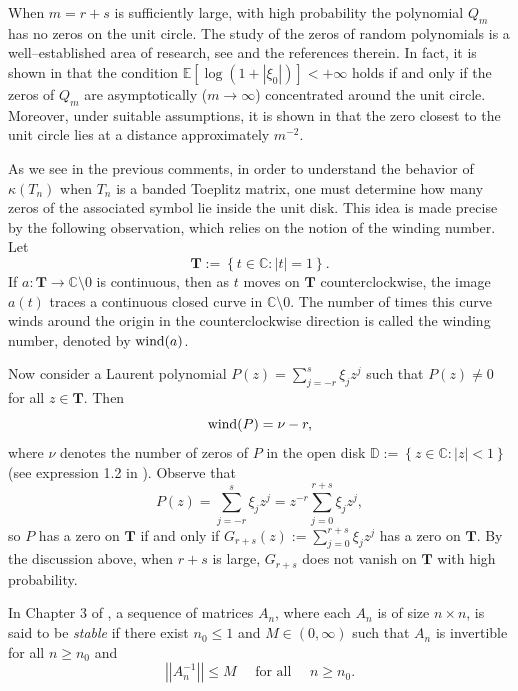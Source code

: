 \documentclass[12pt]{amsart}
\theoremstyle{plain}
\numberwithin{equation}{section}
\newcommand{\<}{\langle}
\renewcommand{\>}{\rangle}
\newcommand{\LL}[1]{\left\{#1\right\}}
\newcommand{\C}{\mathds{C}}
\newcommand{\E}[2][ ]{\mathbb{E}{#1}\left[#2\right]}
\newcommand{\abs}[1]{\left|#1\right|}
\newcommand{\norm}[1]{\left|\left|#1\right|\right|}
\begin{document}
When $m=r+s$ is sufficiently large, with high probability the polynomial $Q_m$ has no zeros on the unit circle. The study of the zeros of random polynomials is a well--established area of research, see \cite{barrera2022zero, bharucha-reid2014random, cook2023universality, ibragimov2013distribution, michelen2020closest, yakir2021approximately} and the references therein. In fact, it is shown in \cite{ibragimov2013distribution} that the condition $\E{\log(1+\abs{\xi_0})} < +\infty$ holds if and only if the zeros of $Q_m$ are asymptotically ($m\to\infty$) concentrated around the unit circle. Moreover, under suitable assumptions, it is shown in \cite{cook2023universality, michelen2020closest} that the zero closest to the unit circle lies at a distance approximately $m^{-2}$.

As we see in the previous comments, in order to understand the behavior of $\kappa(T_n)$ when $T_n$ is a banded Toeplitz matrix, one must determine how many zeros of the associated symbol lie inside the unit disk. This idea is made precise by the following observation, which relies on the notion of the winding number. Let \[ \mathbf{T}:=\LL{t\in\C:\abs{t}=1}. \] If $a:\mathbf{T} \to \C\setminus {0}$ is continuous, then as $t$ moves on $\mathbf{T}$ counterclockwise, the image $a(t)$ traces a continuous closed curve in $\C\setminus{0}$. The number of times this curve winds around the origin in the counterclockwise direction is called the winding number, denoted by $\textnormal{wind}(a)$.

Now consider a Laurent polynomial $P(z)= \sum_{j=-r}^{s} \xi_j z^j$ such that $P(z)\neq 0$ for all $z\in\mathbf{T}$. Then 
\[
\textnormal{wind}(P) = \nu - r,
\]
where $\nu$ denotes the number of zeros of $P$ in the open disk $\mathds{D}:=\LL{z\in\C : \abs{z} < 1}$ (see expression 1.2 in \cite{bottcher2005spectral}). Observe that
\[
P(z) = \sum_{j=-r}^{s} \xi_j z^j = z^{-r} \sum_{j=0}^{r+s} \xi_j z^j,
\]
so $P$ has a zero on $\mathbf{T}$ if and only if $G_{r+s}(z) := \sum_{j=0}^{r+s} \xi_j z^j $ has a zero on $\mathbf{T}$. By the discussion above, when $r+s$ is large, $G_{r+s}$ does not vanish on $\mathbf{T}$ with high probability.

In Chapter 3 of \cite{bottcher2005spectral}, a sequence of matrices ${A_n}$, where each $A_n$ is of size $n\times n$, is said to be {\it stable} if there exist $n_0\leq 1$ and $M\in(0,\infty)$  such that $A_n$ is invertible for all $n\geq n_0$ and
\[
\norm{A_n^{-1}} \leq M \quad \mbox{ for all }\quad  n\geq n_0.
\]
\end{document}
